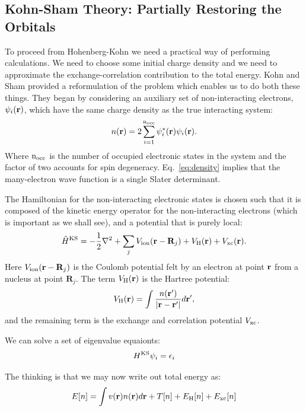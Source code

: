 \subsection{Kohn-Sham Theory: Partially Restoring the Orbitals}
\noindent
To proceed from Hohenberg-Kohn we need a practical way of performing calculations.
We need to choose some initial charge density and we need to approximate the 
exchange-correlation contribution to the total energy.
Kohn and Sham provided a reformulation of the problem which enables us to 
do both these things. They began by considering an auxiliary set of 
non-interacting electrons\cite{kohnsham65}, $\psi_{i}({\bf r})$, 
which have the same charge density as the true interacting system:
%
\begin{equation}
\label{eq:density}
n({\bf r}) = 2\sum^{\rm{n_{occ}}}_{i=1} \psi_{i}^{*}({\bf r})\psi_{i}({\bf r}).
\end{equation}
%
Where $\rm{n_{occ}}$ is the number of occupied electronic states in the system and the
factor of two accounts for spin degeneracy. Eq.~\ref{eq:density} implies that the many-electron
wave function is a single Slater determinant. 

The Hamiltonian for the non-interacting electronic
states is chosen such that it is composed of the kinetic energy operator for 
the non-interacting electrons (which is important as we shall see), 
and a potential that is purely local:
%
\begin{equation}
\label{eq:lda}
\hat{H}^{\rm{KS}} = -\frac{1}{2}\nabla^{2} + \sum_{j}V_{\rm ion}({\bf r}-\mathbf{R}_{j}) + V_{\rm H}({\bf r}) + V_{\rm xc}({\bf r}).
\end{equation}
%
Here $V_{\rm ion}({\bf r}-\mathbf{R}_{j})$ is the Coulomb potential felt by an
electron at point ${\bf r}$ from a nucleus at point $\mathbf{R}_{j}$.
The term $V_{\rm{H}}({\bf r})$ is the Hartree potential:
%
\begin{equation}
V_{\rm{H}}({\bf r}) = \int \frac{n({\bf r}')}{|{\bf r}-{\bf r}'|}d{\bf r}',
\end{equation}
%
and the remaining term is the exchange and correlation potential $V_{\rm{xc}}$. 

We can solve a set of eigenvalue equaionts:
%
\begin{equation}
H^{\rm KS} \psi_{i} = \epsilon_{i}
\end{equation}

The thinking is that we may now write out total energy as:
%
\begin{equation}
E[n] = \int v({\bf r})n({\bf r})d{\bf r} + T[n] + E_{\rm H}[n] + E_{\rm xc}[n]
\end{equation}

